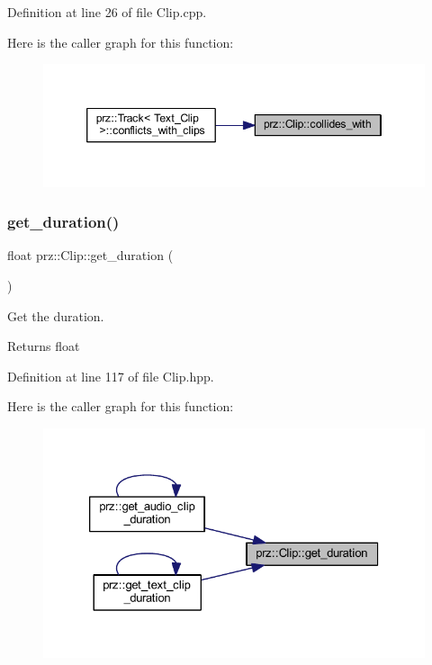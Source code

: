 Definition at line 26 of file Clip.\+cpp.

Here is the caller graph for this function\+:
\nopagebreak
\begin{figure}[H]
\begin{center}
\leavevmode
\includegraphics[width=346pt]{classprz_1_1_clip_a9dfa0b18535130c4b1f69e2f25d08c05_icgraph}
\end{center}
\end{figure}
\mbox{\label{classprz_1_1_clip_a6e870ff68a0f4ff4759007ddb4853f03}} 
\subsubsection{\texorpdfstring{get\_duration()}{get\_duration()}}
{\footnotesize\ttfamily float prz\+::\+Clip\+::get\+\_\+duration (\begin{DoxyParamCaption}{ }\end{DoxyParamCaption})\hspace{0.3cm}{\ttfamily [inline]}}



Get the duration. 

\begin{DoxyReturn}{Returns}
float 
\end{DoxyReturn}


Definition at line 117 of file Clip.\+hpp.

Here is the caller graph for this function\+:
\nopagebreak
\begin{figure}[H]
\begin{center}
\leavevmode
\includegraphics[width=326pt]{classprz_1_1_clip_a6e870ff68a0f4ff4759007ddb4853f03_icgraph}
\end{center}
\end{figure}
\mbox{\label{classprz_1_1_clip_acfe08e188c11afa8ca32b334907fe9f9}} 

